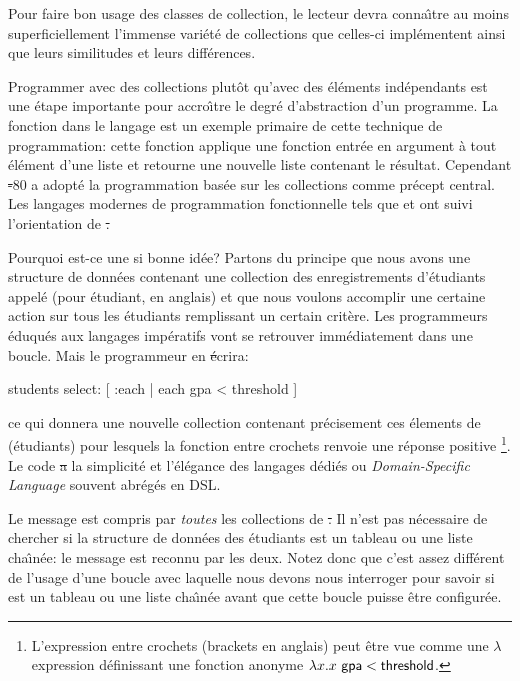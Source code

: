 \documentclass[a4paper,10pt,twoside]{book}
\begin{document}
Pour faire bon usage des classes de collection, le lecteur devra conna\^{\i}tre
au moins superficiellement l'immense vari\'et\'e de collections que celles-ci
impl\'ementent ainsi que leurs similitudes et leurs diff\'erences.

Programmer avec des collections plut\^ot qu'avec des \'el\'ements 
ind\'ependants est une \'etape importante pour accro\^{\i}tre le degr\'e
d'abstraction d'un programme.
La fonction  dans le langage  est un exemple
primaire de cette technique de programmation: cette fonction
applique une fonction entr\'ee en argument \`a tout \'el\'ement d'une
liste et retourne une nouvelle liste contenant le r\'esultat.
Cependant \st-80 a adopt\'e la programmation bas\'ee sur les collections
comme pr\'ecept central.
Les langages modernes de programmation fonctionnelle tels que 
et  ont suivi l'orientation de \st. 

Pourquoi est-ce une si bonne id\'ee?
Partons du principe que nous avons une structure de donn\'ees contenant
une collection des enregistrements d'\'etudiants appel\'e 
(pour \'etudiant, en anglais) et que nous voulons
accomplir une certaine action sur tous les \'etudiants remplissant un
certain crit\`ere.
Les programmeurs \'eduqu\'es aux langages imp\'eratifs vont se retrouver
imm\'ediatement dans une boucle. Mais le programmeur en \st \'ecrira:
\begin{code}{}
students select: [ :each | each gpa < threshold ]
\end{code}
\noindent
ce qui donnera une nouvelle collection contenant pr\'ecisement ces
\'elements de  (\'etudiants) pour lesquels la
fonction entre crochets renvoie une r\'eponse positive \cad {}\footnote{L'expression entre crochets (brackets en anglais) peut \^etre vue comme une 
$\lambda$ expression d\'efinissant une fonction anonyme $\lambda x. x~{\sf gpa} < {\sf threshold}$.
}.
Le code \st a la simplicit\'e et l'\'el\'egance des langages d\'edi\'es ou \emph{Domain-Specific Language} souvent abr\'eg\'es en DSL. 

Le message  est compris par \emph{toutes} les collections de \st.
Il n'est pas n\'ecessaire de chercher si la structure de donn\'ees des \'etudiants est un tableau ou une liste cha\^{\i}n\'ee: 
le message  est reconnu par les deux. 
Notez donc que c'est assez diff\'erent de l'usage d'une boucle avec laquelle
nous devons nous interroger pour savoir si  est un tableau
ou une liste cha\^{\i}n\'ee avant que cette boucle puisse \^etre configur\'ee.
\end{document}
